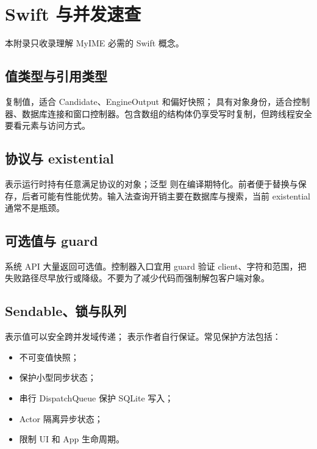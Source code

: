 \chapter{Swift 与并发速查}

本附录只收录理解 MyIME 必需的 Swift 概念。

\section{值类型与引用类型}

 复制值，适合 Candidate、EngineOutput 和偏好快照； 具有对象身份，适合控制器、数据库连接和窗口控制器。包含数组的结构体仍享受写时复制，但跨线程安全要看元素与访问方式。

\section{协议与 existential}

 表示运行时持有任意满足协议的对象；泛型  则在编译期特化。前者便于替换与保存，后者可能有性能优势。输入法查询开销主要在数据库与搜索，当前 existential 通常不是瓶颈。

\section{可选值与 guard}

系统 API 大量返回可选值。控制器入口宜用 guard 验证 client、字符和范围，把失败路径尽早放行或降级。不要为了减少代码而强制解包客户端对象。

\section{Sendable、锁与队列}

 表示值可以安全跨并发域传递； 表示作者自行保证。常见保护方法包括：

\begin{itemize}
  \item 不可变值快照；
  \item {} 保护小型同步状态；
  \item 串行 DispatchQueue 保护 SQLite 写入；
  \item Actor 隔离异步状态；
  \item {} 限制 UI 和 App 生命周期。
\end{itemize}

